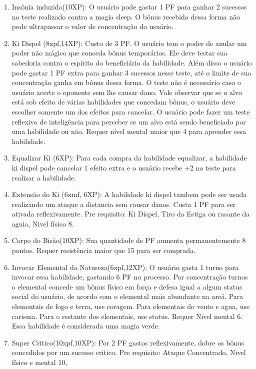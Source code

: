 \begin{enumerate}
	\item Insônia induzida(10XP): O usuário pode gastar 1 PF para ganhar 2 sucessos no teste realizado contra a magia sleep. O bônus recebido dessa forma não pode ultrapassar o valor de concentração do usuário.
	
	  \item Ki Dispel (8xpf,14XP): Custo de 3 PF.
O usuário tem o poder de anular um poder não mágico que conceda bônus temporários. Ele deve testar sua sabedoria contra o espírito do beneficiário da habilidade. Além disso o usuário pode gastar 1 PF extra para ganhar 3 sucessos nesse teste, até o limite de sua concentração ganha em bônus dessa forma. O teste não é necessário caso o usuário acerte o oponente sem lhe causar dano. Vale observar que se o alvo está sob efeito de várias habilidades que concedam bônus, o usuário deve escolher somente um dos efeitos para cancelar. O usuário pode fazer um teste reflexivo de inteligência para perceber se um alvo está sendo beneficiado por uma habilidade ou não. Requer nível mental maior que 4 para aprender essa habilidade.

	\item Equalizar Ki (6XP): Para cada compra da habilidade equalizar, a habilidade ki dispel pode cancelar 1 efeito extra e o usuário recebe +2 no teste para realizar a habilidade.
	
	\item Extensão do Ki (6xmf, 6XP): A habilidade ki dispel tambem pode ser usada realizando um ataque a distancia sem causar danos. Custa 1 PF para ser ativada reflexivamente. Pre requisito: Ki Dispel, Tiro da Estiga ou rasante da aguia, Nivel físico 8.
	
	\item Corpo do Bisão(10XP): Sua quantidade de PF aumenta permanentemente 8 pontos. Requer resistência maior que 15 para ser comprada.

  	\item Invocar Elemental da Natureza(6xpf,12XP): O usuário gasta 1 turno para invocar essa habilidade, gastando 6 PF no processo. Por concentração turnos o elemental concede um bônus físico em força e defesa igual a algum status social do usuário, de acordo com o elemental mais abundante na areá. Para elementais de fogo e terra, use coragem. Para elementais do vento e agua, use carisma. Para o restante dos elementais, use status. Requer Nivel mental 6. Essa habilidade é considerada uma magia verde.

  	\item Super Critico(10xpf,10XP): Por 2 PF gastos reflexivamente, dobre os bônus concedidos por um sucesso critico. Pre requisito: Ataque Concentrado, Nivel físico e mental 10.


\end{enumerate}
